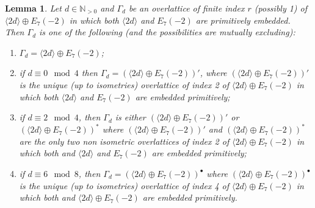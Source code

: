 \documentclass{amsart}
\newtheorem{lem}[thm]{Lemma}
\theoremstyle{definition}
\numberwithin{equation}{section}
\numberwithin{equation}{section} \theoremstyle{definition}
\begin{document}
\begin{lem}\label{lem}\label{lem: overlattices of <2d>+G}
Let $d\in\mathbb{N}_{>0}$ and 
$\Gamma_d$  be an overlattice of finite index $r$ (possibly 1) of $\langle 2d\rangle\oplus E_7(-2)$ in which both $\langle 2d\rangle$ and $E_7(-2)$ are primitively embedded. Then $\Gamma_d$ is one of the following (and the possibilities are mutually excluding):
\begin{enumerate}
\item $\Gamma_d=\langle 2d\rangle\oplus E_7(-2)$;
\item if $d\equiv 0\mod 4$ then $\Gamma_d=(\langle 2d\rangle\oplus E_7(-2))'$, where $(\langle 2d\rangle\oplus E_7(-2))'$ is the unique (up to isometries) overlattice of index 2 of $\langle 2d\rangle\oplus E_7(-2)$ in which both $\langle 2d\rangle$ and $ E_7(-2)$ are embedded primitively;
\item if $d\equiv 2\mod 4$, then $\Gamma_d$ is either $(\langle 2d\rangle\oplus E_7(-2))'$ or $(\langle 2d\rangle\oplus E_7(-2))^*$ where  $(\langle 2d\rangle\oplus E_7(-2))'$ and $(\langle 2d\rangle\oplus E_7(-2))^*$  are the only two non isometric overlattices of index 2 of $\langle 2d\rangle\oplus E_7(-2)$ in which both and $\langle 2d\rangle$ and $E_7(-2)$ are embedded primitively;
\item if $d\equiv 6\mod 8$, then $\Gamma_d=(\langle 2d\rangle\oplus E_7(-2))^{\bullet}$ where $(\langle 2d\rangle\oplus E_7(-2))^{\bullet}$ is the unique (up to isometries) overlattice of index 4 of $\langle 2d\rangle\oplus E_7(-2)$ in which both and $\langle 2d\rangle\oplus E_7(-2)$  are embedded primitively.
\end{enumerate}
\end{lem}
\end{document}
